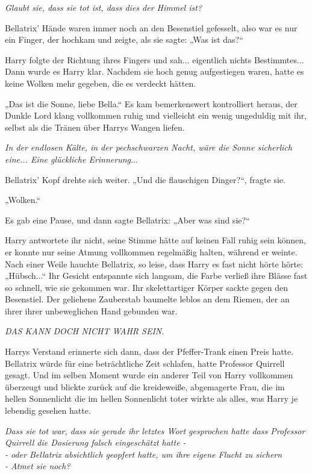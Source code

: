 {\emph{Glaubt sie, dass sie tot ist, dass dies der Himmel ist?}

Bellatrix' Hände waren immer noch an den Besenstiel gefesselt, also war es nur ein Finger, der hochkam und zeigte, als sie sagte: „Was ist das?“

Harry folgte der Richtung ihres Fingers und sah... eigentlich nichts Bestimmtes...\\ Dann wurde es Harry klar. Nachdem sie hoch genug aufgestiegen waren, hatte es keine Wolken mehr gegeben, die es verdeckt hätten.

„Das ist die Sonne, liebe Bella.“ Es kam bemerkenswert kontrolliert heraus, der Dunkle Lord klang vollkommen ruhig und vielleicht ein wenig ungeduldig mit ihr, selbst als die Tränen über Harrys Wangen liefen.

\emph{In der endlosen Kälte, in der pechschwarzen Nacht, wäre die Sonne sicherlich eine... Eine glückliche Erinnerung}...

Bellatrix' Kopf drehte sich weiter. „Und die flauschigen Dinger?“, fragte sie.

„Wolken.“

Es gab eine Pause, und dann sagte Bellatrix: „Aber was sind sie?“

Harry antwortete ihr nicht, seine Stimme hätte auf keinen Fall ruhig sein können, er konnte nur seine Atmung vollkommen regelmäßig halten, während er weinte. Nach einer Weile hauchte Bellatrix, so leise, dass Harry es fast nicht hörte hörte: „Hübsch...“ Ihr Gesicht entspannte sich langsam, die Farbe verließ ihre Blässe fast so schnell, wie sie gekommen war. Ihr skelettartiger Körper sackte gegen den Besenstiel. Der geliehene Zauberstab baumelte leblos an dem Riemen, der an ihrer ihrer unbeweglichen Hand gebunden war.

\emph{DAS KANN DOCH NICHT WAHR SEIN.}

Harrys Verstand erinnerte sich dann, dass der Pfeffer-Trank einen Preis hatte. Bellatrix würde für eine beträchtliche Zeit schlafen, hatte Professor Quirrell gesagt. Und im selben Moment wurde ein anderer Teil von Harry vollkommen überzeugt und blickte zurück auf die kreideweiße, abgemagerte Frau, die im hellen Sonnenlicht die im hellen Sonnenlicht toter wirkte als alles, was Harry je lebendig gesehen hatte.

\emph{Dass sie tot war, dass sie gerade ihr letztes Wort gesprochen hatte dass Professor Quirrell die Dosierung falsch eingeschätzt hatte -}\\ \emph{- oder Bellatrix absichtlich geopfert hatte, um ihre eigene Flucht zu sichern}\\ \emph{- Atmet sie noch?}

}
